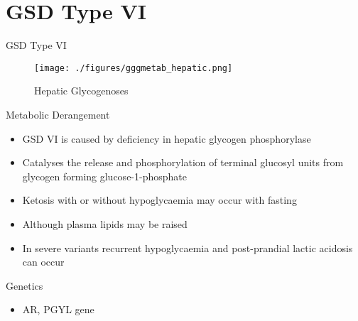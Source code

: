 \documentclass[presentation, smaller]{beamer}
\begin{document}
\section{GSD Type VI}
\label{sec:org1f560f6}
\begin{frame}[label={sec:org4542a39}]{GSD Type VI}
\begin{figure}[htbp]
\centering
\texttt{[image: ./figures/gggmetab\_hepatic.png]}
\caption[Hepatic Glycogenoses]{\label{fig:org5e54a88}
Hepatic Glycogenoses}
\end{figure}
\end{frame}

\begin{frame}[label={sec:org1d06990}]{Metabolic Derangement}
\begin{itemize}
\item GSD VI is caused by deficiency in hepatic glycogen phosphorylase
\item Catalyses the release and phosphorylation of terminal glucosyl units
from glycogen forming glucose-1-phosphate
\item Ketosis with or without hypoglycaemia may occur with fasting
\item Although plasma lipids may be raised
\item In severe variants recurrent hypoglycaemia and post-prandial lactic
acidosis can occur
\end{itemize}
\end{frame}
\begin{frame}[label={sec:orgb8b457a}]{Genetics}
\begin{itemize}
\item AR, PGYL gene
\end{itemize}
\end{frame}
\end{document}
